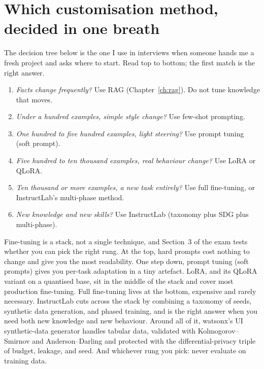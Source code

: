 \section{Which customisation method, decided in one breath}

The decision tree below is the one I use in interviews when someone hands me a fresh project and asks where to start. Read top to bottom; the first match is the right answer.

\begin{enumerate}[leftmargin=*]
    \item \emph{Facts change frequently?} Use RAG (Chapter~\ref{ch:rag}). Do not tune knowledge that moves.
    \item \emph{Under a hundred examples, simple style change?} Use few-shot prompting.
    \item \emph{One hundred to five hundred examples, light steering?} Use prompt tuning (soft prompt).
    \item \emph{Five hundred to ten thousand examples, real behaviour change?} Use LoRA or QLoRA.
    \item \emph{Ten thousand or more examples, a new task entirely?} Use full fine-tuning, or InstructLab's multi-phase method.
    \item \emph{New knowledge \emph{and} new skills?} Use InstructLab (taxonomy plus SDG plus multi-phase).
\end{enumerate}

\begin{takeawaybox}
Fine-tuning is a stack, not a single technique, and Section~3 of the exam tests whether you can pick the right rung. At the top, hard prompts cost nothing to change and give you the most readability. One step down, prompt tuning (soft prompts) gives you per-task adaptation in a tiny artefact. LoRA, and its QLoRA variant on a quantised base, sit in the middle of the stack and cover most production fine-tuning. Full fine-tuning lives at the bottom, expensive and rarely necessary. InstructLab cuts across the stack by combining a taxonomy of seeds, synthetic data generation, and phased training, and is the right answer when you need both new knowledge and new behaviour. Around all of it, watsonx's UI synthetic-data generator handles tabular data, validated with Kolmogorov--Smirnov and Anderson--Darling and protected with the differential-privacy triple of budget, leakage, and seed. And whichever rung you pick: never evaluate on training data.
\end{takeawaybox}

